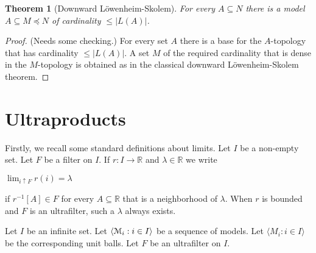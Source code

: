 \documentclass[12pt,letterpaper,oneside,reqno]{amsart}
\theoremstyle{plain}
\newtheorem{theorem}{Theorem}%
\theoremstyle{remark}
\begin{document}
\begin{theorem}[Downward L\"owenheim-Skolem] For every $A\subseteq N$ there is a model $A\subseteq M\preceq N$ of cardinality $\le |L(A)|$.
\end{theorem}
\begin{proof} (Needs some checking.)
  For every set $A$ there is a base for the $A\mbox{-}$topology that has cardinality $\le |L(A)|$. A set $M$ of the required cardinality that is dense in the  $M\mbox{-}$topology is obtained as in the classical downward L\"owenheim-Skolem theorem.
\end{proof}

\section{Ultraproducts}\label{ultrapws}



Firstly, we recall some standard definitions about limits.
Let $I$ be a non-empty set.
Let $F$ be a filter on $I$.
If $r:I\to{\mathds R}$ and $\lambda\in{\mathds R}$ we write

\hfil$\displaystyle \lim_{i\uparrow F}r(i)=\lambda$

if $r^{-1}[A]\in F$ for every $A\subseteq{\mathds R}$ that is a neighborhood of $\lambda$.
When $r$ is bounded and $F$ is an ultrafilter, such a $\lambda$ always exists.

Let $I$ be an infinite set.
Let $\langle {\EuScript M}_i:i\in I\rangle$ be a sequence of models.
Let $\langle M_i:i\in I\rangle$ be the corresponding unit balls.
Let $F$ be an ultrafilter on $I$.
\end{document}
